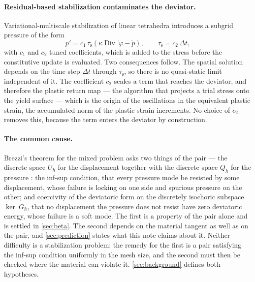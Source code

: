 \documentclass{article}
\newcommand{\disp}{~\varphi}
\newcommand{\Div}{\operatorname{Div}}
\theoremstyle{definition}
\theoremstyle{plain}
\begin{document}
\paragraph{Residual-based stabilization contaminates the deviator.}
Variational-multiscale stabilization of linear tetrahedra
\cite{Scovazzi:2015} introduces a subgrid pressure of the form
\begin{equation}
  \label{eq:vms}
  p' = c_1 \, \tau_{\mathrm s} \left( \kappa \Div \dot{\disp} - \dot{p} \right),
  \qquad
  \tau_{\mathrm s} = c_2 \, \Delta t,
\end{equation}
with $c_1$ and $c_2$ tuned coefficients, which is added to the stress before
the constitutive update is evaluated. Two consequences follow. The spatial
solution depends on the time step $\Delta t$ through $\tau_{\mathrm s}$, so
there is no quasi-static limit independent of it. The coefficient $c_2$ scales
a term that reaches the deviator, and therefore the plastic return map --- the
algorithm that projects a trial stress onto the yield surface --- which is the
origin of the oscillations in the equivalent plastic strain, the accumulated
norm of the plastic strain increments. No choice of $c_2$ removes this,
because the term enters the deviator by construction.

\paragraph{The common cause.} Brezzi's theorem for the mixed problem asks two things of
the pair --- the discrete space $U_h$ for the displacement together with the
discrete space $Q_h$ for the pressure
\cite[\S3.4, \S5.2]{BoffiBrezziFortin:2013}: the inf-sup condition,
that every pressure mode be resisted by some displacement, whose failure is
locking on one side and spurious pressure on the other; and coercivity of the
deviatoric form on the discretely isochoric subspace $\ker ~G_h$, that no
displacement the pressure does not resist have zero deviatoric energy, whose
failure is a soft mode.
The first is a property of the pair alone and is settled in \cref{sec:beta}.
The second depends on the material tangent as well as on the pair, and
\cref{sec:prediction} states what this note claims about it. Neither
difficulty is a stabilization problem: the remedy for the first is a pair
satisfying the inf-sup condition uniformly in the mesh size, and the second
must then be checked where the material can violate it.
\cref{sec:background} defines both hypotheses.
\end{document}
